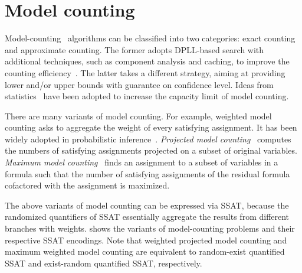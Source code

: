 \section{Model counting}
\label{sect:related-work-model-counting}

Model-counting~\cite{SATHandbook-ModelCounting} algorithms can be classified into two categories:
exact counting and approximate counting.
The former adopts DPLL-based search with additional techniques,
such as component analysis and caching, to improve the counting efficiency~\cite{Sang2004,Sang2005ModelCounting}.
The latter takes a different strategy,
aiming at providing lower and/or upper bounds with guarantee on confidence level.
Ideas from statistics~\cite{Chakraborty2016} have been adopted to increase the capacity limit of model counting.

There are many variants of model counting.
For example,
weighted model counting asks to aggregate the weight of every satisfying assignment.
It has been widely adopted in probabilistic inference~\cite{Sang2005BayesianInference,Chavira2008}.
\textit{Projected model counting}~\cite{Aziz2015} computes the numbers of satisfying assignments
projected on a subset of original variables.
\textit{Maximum model counting}~\cite{Fremont2017} finds an assignment to a subset of variables in a formula
such that the number of satisfying assignments of the residual formula cofactored with the assignment is maximized.

The above variants of model counting can be expressed via SSAT,
because the randomized quantifiers of SSAT essentially aggregate the results from different branches with weights.
 shows the variants of model-counting problems and their respective SSAT encodings.
Note that weighted projected model counting and maximum weighted model counting are equivalent to
random-exist quantified SSAT and exist-random quantified SSAT, respectively.

